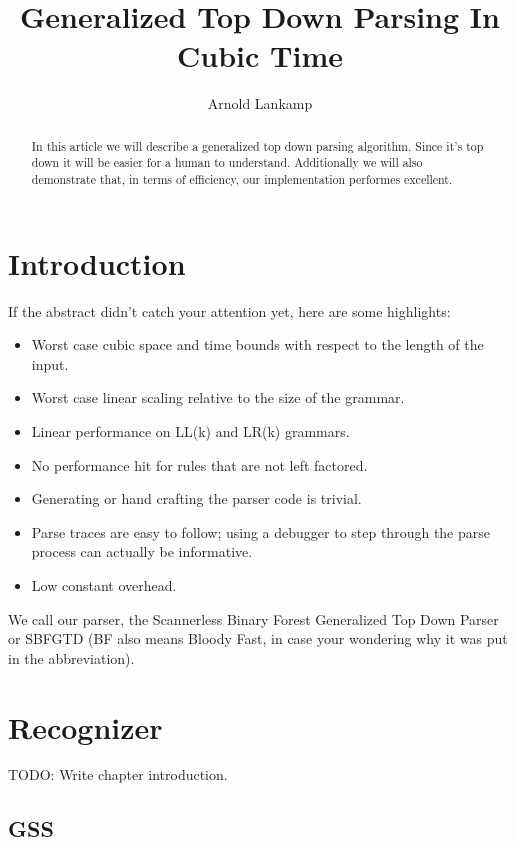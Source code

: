\documentclass[a4paper,10pt]{article}
\title{Generalized Top Down Parsing In Cubic Time}
\author{Arnold Lankamp}
\begin{document}
\maketitle

\begin{abstract}

In this article we will describe a generalized top down parsing algorithm. Since it's top down it will be easier for a human to understand. Additionally we will also demonstrate that, in terms of efficiency, our implementation performes excellent.

\end{abstract}

\section{Introduction}

If the abstract didn't catch your attention yet, here are some highlights:
\begin{itemize}
 \setlength{\itemsep}{0pt}
 \setlength{\parskip}{0pt}
 \setlength{\parsep}{0pt}

 \item Worst case cubic space and time bounds with respect to the length of the input.
 \item Worst case linear scaling relative to the size of the grammar.
 \item Linear performance on LL(k) and LR(k) grammars.
 \item No performance hit for rules that are not left factored.
 \item Generating or hand crafting the parser code is trivial.
 \item Parse traces are easy to follow; using a debugger to step through the parse process can actually be informative.
 \item Low constant overhead.
\end{itemize}
We call our parser, the Scannerless Binary Forest Generalized Top Down Parser or SBFGTD (BF also means Bloody Fast, in case your wondering why it was put in the abbreviation).

\section{Recognizer}

TODO: Write chapter introduction.

\subsection{GSS}
\end{document}
